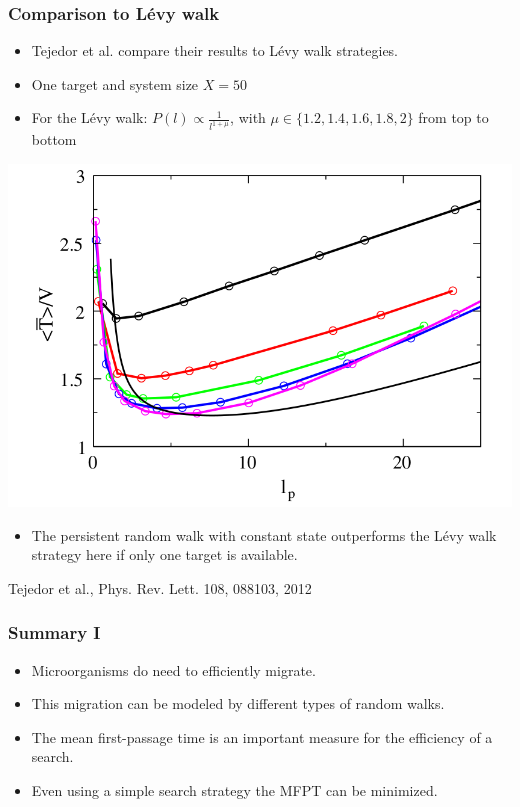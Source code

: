 \documentclass[11pt]{beamer}
\begin{document}
\begin{frame}
 \frametitle{Comparison to Lévy walk}
 
 \begin{minipage}[h]{0.49\textwidth}
  \begin{itemize}
  \item Tejedor et al. compare their results to Lévy walk strategies.
  \item One target and system size $X=50$
  \item For the Lévy walk: $P\left(l\right) \propto \frac{1}{l^{1+\mu}}$, with $\mu \in \{1.2, 1.4, 1.6, 1.8, 2\}$ from top to bottom
 \end{itemize}
 \end{minipage}
 \begin{minipage}[h]{0.49\textwidth}
  \centering
  \includegraphics[width=\textwidth]{gfx/tejedor-levywalk.png}
 \end{minipage}
 \begin{itemize}
  \item The persistent random walk with constant state outperforms the Lévy walk strategy here if only one target is available.
 \end{itemize}
\centering
 {\tiny Tejedor et al., Phys. Rev. Lett. 108, 088103, 2012}
\end{frame}


\begin{frame}
 \frametitle{Summary I}
 
 \begin{itemize}
  \item Microorganisms do need to efficiently migrate.
  \item This migration can be modeled by different types of random walks.
  \item The mean first-passage time is an important measure for the efficiency of a search.
  \item Even using a simple search strategy the MFPT can be minimized.
 \end{itemize}

\end{frame}
\end{document}
